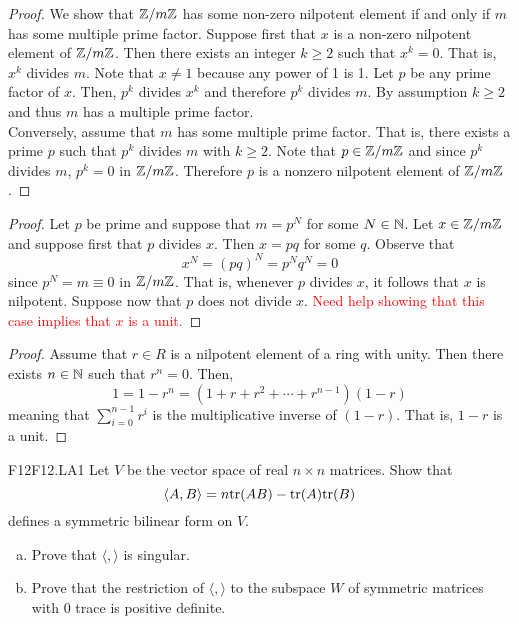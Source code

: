 \documentclass[../AlgebraQualSolutions.tex]{subfiles}
\begin{document}
	\begin{proof}
		We show that $\mathbb{Z}/m\mathbb{Z}$ has some non-zero nilpotent element if and only if $m$ has some multiple prime factor. Suppose first that $x$ is a non-zero nilpotent element of $\mathbb{Z}/m\mathbb{Z}$. Then there exists an integer $k \geq 2$ such that $x^k = 0$. That is, $x^k$ divides $m$. Note that $x \neq 1$ because any power of 1 is 1. Let $p$ be any prime factor of $x$. Then, $p^k$ divides $x^k$ and therefore $p^k$ divides $m$. By assumption $k \geq 2$ and thus $m$ has a multiple prime factor.\\

		Conversely, assume that $m$ has some multiple prime factor. That is, there exists a prime $p$ such that $p^k$ divides $m$ with $k \geq 2$. Note that $p \in \mathbb{Z}/m\mathbb{Z}$ and since $p^k$ divides $m$, $p^k = 0$ in $\mathbb{Z}/m\mathbb{Z}$. Therefore $p$ is a nonzero nilpotent element of $\mathbb{Z}/m\mathbb{Z}$.
	\end{proof}

	\begin{proof}
		Let $p$ be prime and suppose that $m = p^N$ for some $N \in \mathbb{N}$. Let $x \in \mathbb{Z}/m\mathbb{Z}$ and suppose first that $p$ divides $x$. Then $x = pq$ for some $q$. Observe that
			\[x^N = (pq)^N = p^Nq^N = 0\]
		since $p^N = m \equiv 0$ in $\mathbb{Z}/m\mathbb{Z}$. That is, whenever $p$ divides $x$, it follows that $x$ is nilpotent. Suppose now that $p$ does not divide $x$. \textcolor{red}{Need help showing that this case implies that $x$ is a unit.}
	\end{proof}

	\begin{proof}
		Assume that $r \in R$ is a nilpotent element of a ring with unity. Then there exists $n \in \mathbb{N}$ such that $r^n = 0$. Then,
			\[1 = 1 - r^n = (1 + r + r^2 + \cdots + r^{n-1})(1-r)\]
		meaning that $\sum_{i=0}^{n-1}r^i$ is the multiplicative inverse of $(1-r)$. That is, $1-r$ is a unit.
	\end{proof}
	
	\begin{prob}{F12}{F12.LA1}
	Let $V$ be the vector space of real $n \times n$ matrices. Show that 	
		\[\langle A, B \rangle = n \mathrm{tr}(AB) - \mathrm{tr}(A)\mathrm{tr}(B) \]
	defines a symmetric bilinear form on $V$.
	\begin{enumerate}[(a)]
	\item Prove that $\langle,\rangle$ is singular.
	\item Prove that the restriction of $\langle,\rangle$ to the subspace $W$ of symmetric matrices with 0 trace is positive definite.
	\end{enumerate}
	\end{prob}
\end{document}

